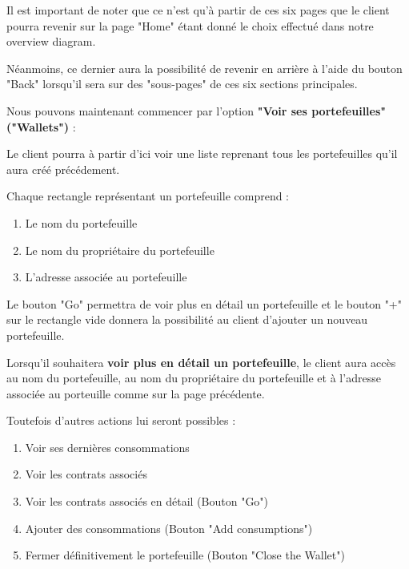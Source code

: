 \begin{flushleft}
Il est important de noter que ce n'est qu'à partir de ces six pages que le client pourra revenir sur la page "Home" étant donné le choix effectué dans notre overview diagram.
\end{flushleft}

\begin{flushleft}
Néanmoins, ce dernier aura la possibilité de revenir en arrière à l'aide du bouton "Back" lorsqu'il sera sur des "sous-pages" de ces six sections principales.
\end{flushleft}

\newpage
\begin{flushleft}
Nous pouvons maintenant commencer par l'option \textbf{"Voir ses portefeuilles" ("Wallets")} :
\end{flushleft}

\begin{flushleft}
Le client pourra à partir d'ici voir une liste reprenant tous les portefeuilles qu'il aura créé précédement. 
\end{flushleft}
\begin{flushleft}
Chaque rectangle représentant un portefeuille comprend :
\end{flushleft}
\begin{enumerate}
\item Le nom du portefeuille
\item Le nom du propriétaire du portefeuille
\item L'adresse associée au portefeuille
\end{enumerate}
\begin{flushleft}
Le bouton "Go" permettra de voir plus en détail un portefeuille et le bouton "+" sur le rectangle vide donnera la possibilité au client d'ajouter un nouveau portefeuille.
\end{flushleft}
\begin{flushleft}

Lorsqu'il souhaitera \textbf{voir plus en détail un portefeuille}, le client aura accès au nom du portefeuille, au nom du propriétaire du portefeuille et à l'adresse associée au porteuille comme sur la page précédente.
\end{flushleft}
\begin{flushleft}
Toutefois d'autres actions lui seront possibles :
\end{flushleft}
\begin{enumerate}
\item Voir ses dernières consommations
\item Voir les contrats associés
\item Voir les contrats associés en détail (Bouton "Go")
\item Ajouter des consommations (Bouton "Add consumptions")
\item Fermer définitivement le portefeuille (Bouton "Close the Wallet")
\end{enumerate}

